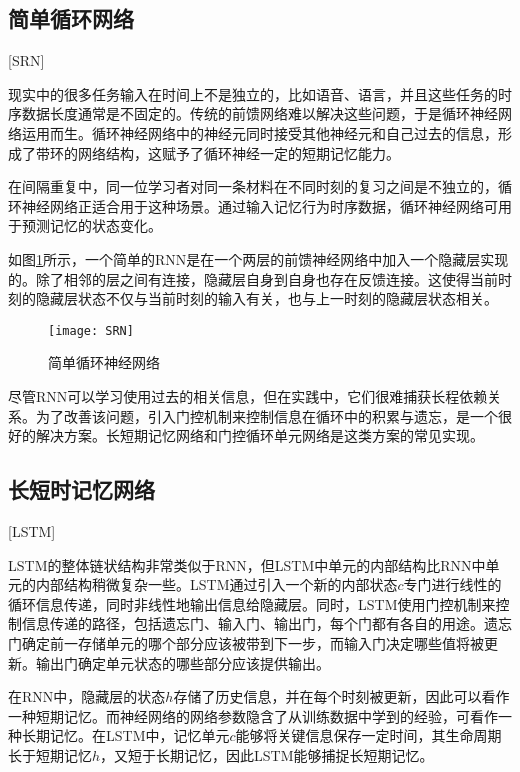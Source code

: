 \subsection{简单循环网络}[SRN]

现实中的很多任务输入在时间上不是独立的，比如语音、语言，并且这些任务的时序数据长度通常是不固定的。传统的前馈网络难以解决这些问题，于是循环神经网络运用而生。循环神经网络中的神经元同时接受其他神经元和自己过去的信息，形成了带环的网络结构，这赋予了循环神经一定的短期记忆能力。

在间隔重复中，同一位学习者对同一条材料在不同时刻的复习之间是不独立的，循环神经网络正适合用于这种场景。通过输入记忆行为时序数据，循环神经网络可用于预测记忆的状态变化。

如图\ref{fig:SRN}所示，一个简单的RNN是在一个两层的前馈神经网络中加入一个隐藏层实现的。除了相邻的层之间有连接，隐藏层自身到自身也存在反馈连接。这使得当前时刻的隐藏层状态不仅与当前时刻的输入有关，也与上一时刻的隐藏层状态相关。

\begin{figure}[htbp]
    \centering
    \texttt{[image: SRN]}
    \caption{简单循环神经网络\cite[137]{qiu2020nndl}}
    \label{fig:SRN}
\end{figure}

尽管RNN可以学习使用过去的相关信息，但在实践中，它们很难捕获长程依赖关系。为了改善该问题，引入门控机制来控制信息在循环中的积累与遗忘，是一个很好的解决方案。长短期记忆网络\cite{hochreiterLongShortTermMemory1997}和门控循环单元网络\cite{choPropertiesNeuralMachine2014}是这类方案的常见实现。

\subsection{长短时记忆网络}[LSTM]

LSTM的整体链状结构非常类似于RNN，但LSTM中单元的内部结构比RNN中单元的内部结构稍微复杂一些。LSTM通过引入一个新的内部状态$c$专门进行线性的循环信息传递，同时非线性地输出信息给隐藏层。同时，LSTM使用门控机制来控制信息传递的路径，包括遗忘门、输入门、输出门，每个门都有各自的用途。遗忘门确定前一存储单元的哪个部分应该被带到下一步，而输入门决定哪些值将被更新。输出门确定单元状态的哪些部分应该提供输出。

在RNN中，隐藏层的状态$h$存储了历史信息，并在每个时刻被更新，因此可以看作一种短期记忆。而神经网络的网络参数隐含了从训练数据中学到的经验，可看作一种长期记忆。在LSTM中，记忆单元$c$能够将关键信息保存一定时间，其生命周期长于短期记忆$h$，又短于长期记忆，因此LSTM能够捕捉长短期记忆。

